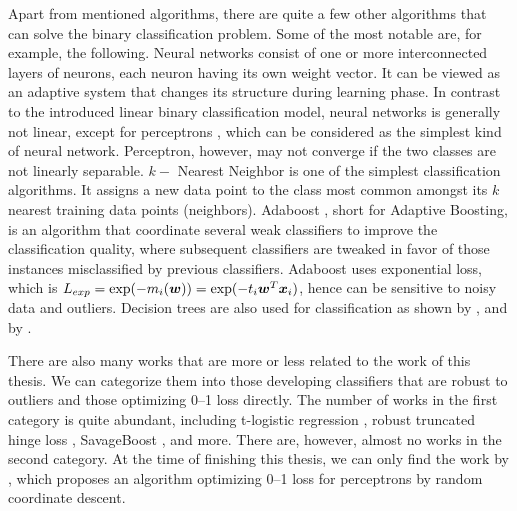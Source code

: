 Apart from mentioned algorithms, there are quite a few other
algorithms that can solve the binary classification problem. Some of
the most notable are, for example, the following. Neural networks
\cite{bishop2} consist of one or more interconnected layers of
neurons, each neuron having its own weight vector. It can be viewed as
an adaptive system that changes its structure during learning
phase. In contrast to the introduced linear binary classification
model, neural networks is generally not linear, except for perceptrons
\cite{perceptron}, which can be considered as the simplest kind of
neural network. Perceptron, however, may not converge if the two
classes are not linearly separable. $k-$ Nearest Neighbor \cite{kNN}
is one of the simplest classification algorithms. It assigns a new
data point to the class most common amongst its $k$ nearest training
data points (neighbors). Adaboost \cite{adaboost}, short for Adaptive
Boosting, is an algorithm that coordinate several weak classifiers to
improve the classification quality, where subsequent classifiers are
tweaked in favor of those instances misclassified by previous
classifiers. Adaboost uses exponential loss, which is $L_{exp} =
\exp(-m_i(\boldsymbol{w})) = \exp(-t_i\boldsymbol{w}^T\boldsymbol{x}_i)$, hence can be sensitive to noisy
data and outliers. Decision trees are also used for classification as
shown by \cite{tree1}, and by \cite{tree2}.

There are also many works that are more or less related to the work of
this thesis. We can categorize them into those developing classifiers
that are robust to outliers and those optimizing 0--1 loss
directly. The number of works in the first category is quite abundant,
including t-logistic regression \cite{Ding}, robust truncated hinge
loss \cite{robusthinge}, SavageBoost \cite{lossdesign}, and
more. There are, however, almost no works in the second category. At
the time of finishing this thesis, we can only find the work by
\cite{ling}, which proposes an algorithm optimizing 0--1 loss for
perceptrons by random coordinate descent.

\ENDCOMMENT
